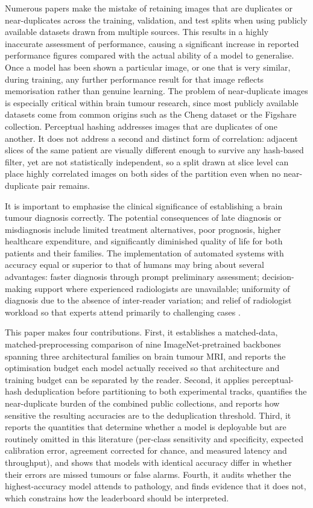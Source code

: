 \documentclass[final,3p,times,number]{elsarticle}
\begin{document}
Numerous papers make the mistake of retaining images that are duplicates or near-duplicates across the training, validation, and test splits when using publicly available datasets drawn from multiple sources. This results in a highly inaccurate assessment of performance, causing a significant increase in reported performance figures compared with the actual ability of a model to generalise. Once a model has been shown a particular image, or one that is very similar, during training, any further performance result for that image reflects memorisation rather than genuine learning. The problem of near-duplicate images is especially critical within brain tumour research, since most publicly available datasets come from common origins such as the Cheng dataset or the Figshare collection. Perceptual hashing addresses images that are duplicates of one another. It does not address a second and distinct form of correlation: adjacent slices of the same patient are visually different enough to survive any hash-based filter, yet are not statistically independent, so a split drawn at slice level can place highly correlated images on both sides of the partition even when no near-duplicate pair remains.

It is important to emphasise the clinical significance of establishing a brain tumour diagnosis correctly. The potential consequences of late diagnosis or misdiagnosis include limited treatment alternatives, poor prognosis, higher healthcare expenditure, and significantly diminished quality of life for both patients and their families. The implementation of automated systems with accuracy equal or superior to that of humans may bring about several advantages: faster diagnosis through prompt preliminary assessment; decision-making support where experienced radiologists are unavailable; uniformity of diagnosis due to the absence of inter-reader variation; and relief of radiologist workload so that experts attend primarily to challenging cases \cite{ref13,ref14}.

This paper makes four contributions. First, it establishes a matched-data, matched-preprocessing comparison of nine ImageNet-pretrained backbones spanning three architectural families on brain tumour MRI, and reports the optimisation budget each model actually received so that architecture and training budget can be separated by the reader. Second, it applies perceptual-hash deduplication before partitioning to both experimental tracks, quantifies the near-duplicate burden of the combined public collections, and reports how sensitive the resulting accuracies are to the deduplication threshold. Third, it reports the quantities that determine whether a model is deployable but are routinely omitted in this literature (per-class sensitivity and specificity, expected calibration error, agreement corrected for chance, and measured latency and throughput), and shows that models with identical accuracy differ in whether their errors are missed tumours or false alarms. Fourth, it audits whether the highest-accuracy model attends to pathology, and finds evidence that it does not, which constrains how the leaderboard should be interpreted.
\end{document}
